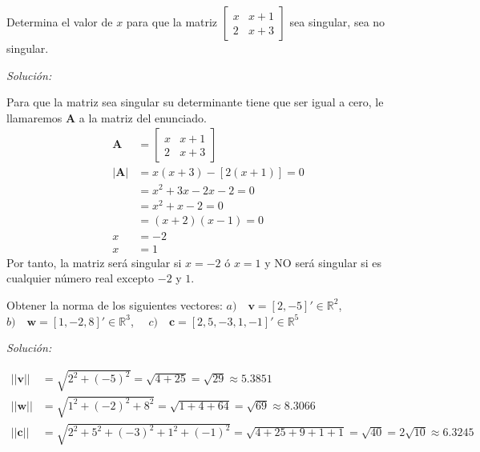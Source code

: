 \documentclass[12pt]{article}
\newenvironment{problem}[2][Problema]{\begin{trivlist}
\item[\hskip \labelsep {\bfseries #1}\hskip \labelsep {\bfseries #2.}]}{\end{trivlist}}
\newenvironment{sol}
    {\emph{Solución:}
    }
    {
    }
\begin{document}
\pagebreak

\begin{problem}{7}
Determina el valor de $x$ para que la matriz 
$\begin{bmatrix}
	x & x+1 \\
	2 & x+3 
\end{bmatrix}$ sea singular, sea no singular.
\end{problem}

\begin{sol}
Para que la matriz sea singular su determinante tiene que ser igual a cero, le llamaremos \textbf{A} a la matriz del enunciado.
\begin{align*}
\mathbf{A}&=
\begin{bmatrix}
	x & x+1 \\
	2 & x+3 
\end{bmatrix}\\
|\mathbf{A}| &= 
x(x+3) -[ 2(x+1)] = 0 \\
&= x^2+3x -2x-2 = 0 \\
&= x^2 +x -2 =0\\
&= (x+2)(x-1)=0\\
x&=-2\\
x&=1
\end{align*}
Por tanto, la matriz será singular si $x=-2$ ó $x=1$ y NO será singular si es cualquier número real excepto $-2$ y $1$.
\end{sol}

\pagebreak

\begin{problem}{8}
Obtener la norma de los siguientes vectores: $a)\quad\mathbf{v}=[2,-5]' \in \mathbb{R}^2$,\\
 $b)\quad\mathbf{w}=[1,-2,8]' \in \mathbb{R}^3$, $\quad c) \quad\mathbf{c}=[2,5,-3,1,-1]' \in \mathbb{R}^5$
\end{problem}
\begin{sol}
\begin{align*}
||\mathbf{v}|| &= \sqrt{2^2+(-5)^2}=\sqrt{4+25}=\sqrt{29}\approx  5.3851\\
||\mathbf{w}|| &= \sqrt{1^2+(-2)^2+8^2} = \sqrt{1+4+64} = \sqrt{69} \approx 8.3066 \\
||\mathbf{c}|| &=  \sqrt{2^2+5^2+(-3)^2+1^2+(-1)^2} = \sqrt{4+25+9+1+1} = \sqrt{40} = 2\sqrt{10} \approx 6.3245
\end{align*}


\end{sol}

\end{document}
